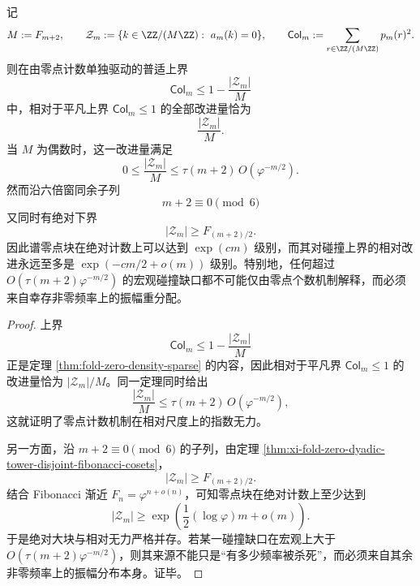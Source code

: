 \begin{theorem}[谱零点计数机制的宏观无力]\label{thm:conclusion-zero-set-count-macro-impotence}
记
\[
M:=F_{m+2},
\qquad
\mathcal Z_m:=\{k\in \ZZ/(M\ZZ):\ a_m(k)=0\},
\qquad
\mathsf{Col}_m:=\sum_{r\in\ZZ/(M\ZZ)}p_m(r)^2.
\]
则在由零点计数单独驱动的普适上界
\[
\mathsf{Col}_m\le 1-\frac{|\mathcal Z_m|}{M}
\]
中，相对于平凡上界 \(\mathsf{Col}_m\le 1\) 的全部改进量恰为
\[
\frac{|\mathcal Z_m|}{M}.
\]
当 \(M\) 为偶数时，这一改进量满足
\[
0\le \frac{|\mathcal Z_m|}{M}\le \tau(m+2)\,O(\varphi^{-m/2}).
\]
然而沿六倍窗同余子列
\[
m+2\equiv 0\pmod 6
\]
又同时有绝对下界
\[
|\mathcal Z_m|\ge F_{(m+2)/2}.
\]
因此谱零点块在绝对计数上可以达到 \(\exp(c m)\) 级别，而其对碰撞上界的相对改进永远至多是 \(\exp(-c m/2+o(m))\) 级别。特别地，任何超过 \(O(\tau(m+2)\varphi^{-m/2})\) 的宏观碰撞缺口都不可能仅由零点个数机制解释，而必须来自幸存非零频率上的振幅重分配。
\end{theorem}
\begin{proof}
上界
\[
\mathsf{Col}_m\le 1-\frac{|\mathcal Z_m|}{M}
\]
正是定理 \ref{thm:fold-zero-density-sparse} 的内容，因此相对于平凡界 \(\mathsf{Col}_m\le 1\) 的改进量恰为 \(|\mathcal Z_m|/M\)。同一定理同时给出
\[
\frac{|\mathcal Z_m|}{M}\le \tau(m+2)\,O(\varphi^{-m/2}),
\]
这就证明了零点计数机制在相对尺度上的指数无力。

另一方面，沿 \(m+2\equiv 0\pmod 6\) 的子列，由定理 \ref{thm:xi-fold-zero-dyadic-tower-disjoint-fibonacci-cosets}，
\[
|\mathcal Z_m|\ge F_{(m+2)/2}.
\]
结合 Fibonacci 渐近 \(F_n=\varphi^{n+o(n)}\)，可知零点块在绝对计数上至少达到
\[
|\mathcal Z_m|\ge \exp\!\left(\frac12(\log\varphi)m+o(m)\right).
\]
于是绝对大块与相对无力严格并存。若某一碰撞缺口在宏观上大于 \(O(\tau(m+2)\varphi^{-m/2})\)，则其来源不能只是“有多少频率被杀死”，而必须来自其余非零频率上的振幅分布本身。证毕。
\end{proof}


